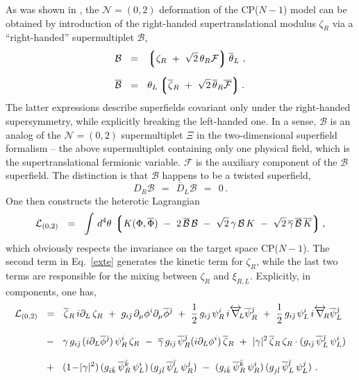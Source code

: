 \documentclass[12pt]{article}
\def\beq{\begin{equation}}
\def\eeq{\end{equation}}
\newcommand{\ntwoo}{${\mathcal N}= \left(0,2\right) $ }
\newcommand{\p}{\partial}
\newcommand{\ov}{\overline}
\newcommand{\mc}[1]{\mathcal{#1}}
\newcommand{\lgr}{\left\lgroup}
\newcommand{\rgr}{\right\rgroup}
\newcommand{\bzr}{\ov{\zeta}{}_R}
\newcommand{\zr}{\zeta_R}
\newcommand{\bj}{{\bar \jmath}}
\newcommand{\bk}{{\bar k}}
\newcommand{\bl}{{\bar l}}
\begin{document}
	As was shown in \cite{SYhet},  the \ntwoo deformation of the CP($N-1$) model can be obtained by
	introduction of the right-handed supertranslational modulus $ \zeta_R $ via a ``right-handed'' 
	supermultiplet $ \mc{B} $,
\begin{align*}
%
	\mc{B} & ~~=~~ \lgr \zr ~+~ \sqrt{2}\,\theta_R\mc{F} \rgr \ov{\theta}{}_L~, \\[2mm]
%
	\ov{\mc{B}} & ~~=~~ \theta_L \lgr \bzr ~+~ \sqrt{2}\, \ov{\theta}{}_R \ov{\mc{F}} \rgr.
\end{align*}
	The latter expressions describe superfields covariant only under the right-handed supersymmetry, 
	while explicitly breaking the left-handed one.
	In a sense, $ \mc{B} $ is an analog of the \ntwoo supermultiplet $\Xi$ in the two-dimensional 
	superfield formalism \cite{Edalati} --
	the above supermultiplet containing only one physical field, which is the supertranslational
	fermionic variable. ${\mathcal F}$ is the auxiliary component of the $\mc{B}$ superfield.
	The distinction is that $ \mc{B} $ happens to be a twisted superfield,
\[
	D_R \mc{B} ~~=~~ \ov{D}_L\mc{B} ~~=~~ 0\,.
\]
One then constructs the heterotic Lagrangian
\beq
\label{exte}
	\mc{L}_{(0,2)} ~~=~~ \int\, d^4\theta\, \lgr K(\Phi,\ov{\Phi}) 
		~-~ 2\, \ov{\mc{B}}\,\mc{B}  
		~-~  \sqrt{2}\, \gamma\,\mc{B}\,K  ~-~ \sqrt{2}\, \ov{\gamma}\,\ov{\mc{B}}\,\ov{K} \rgr,
\eeq
	which obviously respects the invariance on the target space CP($N-1$).
	The second term in Eq.~\eqref{exte} generates the kinetic term for $ \zr $, while the last two terms 
	are responsible for the mixing between $ \zr $ and $ \xi_{R,L} $.
	Explicitly, in components, one has,
\begin{align}
%
\notag
	\mc{L}_{(0,2)} & ~~=~~  \bzr\, i\p_L\, \zr 
			~+~ g_{i\bj}\,\p_\mu \phi^i \p_\mu\ov{\phi}{}^\bj
			~+~ \frac{1}{2}\, g_{i\bj}\, \psi^i_R\, i\overleftrightarrow{\nabla}{}_{\!\!L} \ov{\psi}{}^\bj_R 
			~+~ \frac{1}{2}\, g_{i\bj}\, \psi^i_L\, i\overleftrightarrow{\nabla}{}_{\!\!R} \ov{\psi}{}^\bj_L 
	\\[3mm]
%
\label{cpn-1g}
			& 
			~~-~~ \gamma\, g_{i\bj}\, (i \p_L \ov{\phi}{}^\bj)\, \psi_R^i\, \zr
			~-~ \ov{\gamma}\, g_{i\bj}\, \ov{\psi}{}_R^\bj (i \p_L \phi^i)\, \bzr
			~+~ |\gamma|^2\, \bzr\,\zr \cdot ( g_{i\bj}\, \ov{\psi}{}_L^\bj\, \psi_L^i )
	\\[3mm]
%
\notag
			& 
			~~+~~ (1 \!-\! |\gamma|^2)\, (g_{i\bk}\, \ov{\psi}{}_R^\bk\, \psi_L^i)\,
						     (g_{j\bl}\, \ov{\psi}{}_L^\bl\, \psi_R^j)
			~-~ (g_{i\bk}\, \ov{\psi}{}_R^\bk\, \psi_R^i)\, (g_{j\bl}\, \ov{\psi}{}_L^\bl\, \psi_L^j)~.
\end{align}
	
\end{document}
